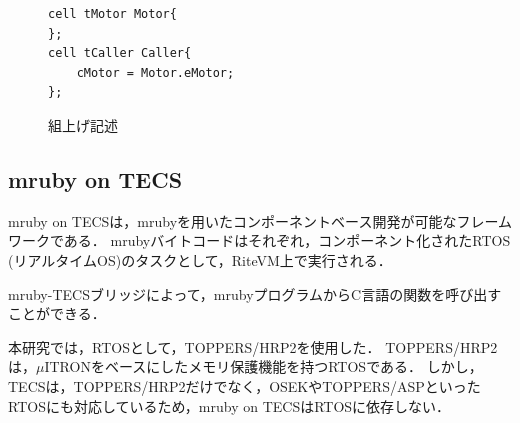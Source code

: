 \documentclass[submit,techrep]{ipsj}
\begin{document}
\begin{figure}[t]
\centering
\begin{lstlisting}
cell tMotor Motor{
};
cell tCaller Caller{
    cMotor = Motor.eMotor;
};
\end{lstlisting}
    \vspace{-2mm}
\caption{組上げ記述}
\vspace{-4mm}
\label{build}
\end{figure}

\vspace{-5mm} 
\subsection{mruby on TECS}
\label{sec:mruby on TECS}
mruby on TECSは，mrubyを用いたコンポーネントベース開発が可能なフレームワークである．
mrubyバイトコードはそれぞれ，コンポーネント化されたRTOS (リアルタイムOS)のタスクとして，RiteVM上で実行される．

mruby-TECSブリッジによって，mrubyプログラムからC言語の関数を呼び出すことができる．

本研究では，RTOSとして，TOPPERS/HRP2\cite{par:hr-tecs}を使用した．
TOPPERS/HRP2は，$\mu$ITRON\cite{par:microITRON}をベースにしたメモリ保護機能を持つRTOSである．
しかし，TECSは，TOPPERS/HRP2だけでなく，OSEK\cite{par:OSEK}やTOPPERS/ASP\cite{par:ASP}といったRTOSにも対応しているため，mruby on TECSはRTOSに依存しない．

\end{document}
